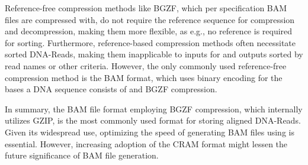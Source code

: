 Reference-free compression methods like BGZF, which per specification BAM files are compressed with, do not require the reference sequence for compression and decompression, making them more flexible, as e.g., no reference is required for sorting. Furthermore, reference-based compression methods often necessitate sorted DNA-Reads, making them inapplicable to inputs for \sort and outputs sorted by read names or other criteria. However, the only commonly used reference-free compression method is the BAM format, which uses binary encoding for the bases a DNA sequence consists of and BGZF compression. 

In summary, the BAM file format employing BGZF compression, which internally utilizes GZIP, is the most commonly used format for storing aligned DNA-Reads. Given its widespread use, optimizing the speed of generating BAM files using \sort is essential. However, increasing adoption of the CRAM format might lessen the future significance of BAM file generation.

